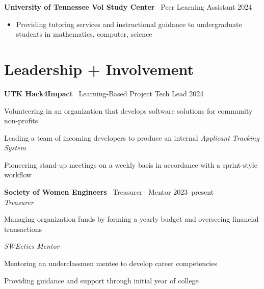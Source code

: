 \documentclass[11pt,a4paper]{article}
\begin{document}
\noindent
\textbf{University of Tennessee Vol Study Center} \textbar\ Peer Learning Assistant \hfill 2024 \vspace{-4pt}
\begin{itemize}[leftmargin=*, topsep=0pt, itemsep=0pt, partopsep=0pt, parsep=0pt]
  \small
  \item Providing tutoring services and instructional guidance to undergraduate students in mathematics, computer, science
\end{itemize}
\vspace{-4pt}

\section*{Leadership + Involvement}

\noindent
\textbf{UTK Hack4Impact} \textbar\ Learning-Based Project Tech Lead \hfill 2024 \vspace{-4pt}
\begin{itemize}[leftmargin=*, topsep=0pt, itemsep=1pt, partopsep=0pt, parsep=0pt]
  {\small
  \item Volunteering in an organization that develops software solutions for community non-profits
  \item Leading a team of incoming developers to produce an internal \textit{Applicant Tracking System}
  \item Pioneering stand-up meetings on a weekly basis in accordance with a sprint-style workflow
  }
\end{itemize}
\vspace{-5pt}

\noindent
\textbf{Society of Women Engineers} \textbar\ Treasurer \textbar\ Mentor \hfill 2023--present \\ [-1pt]
\noindent\textit{Treasurer} \vspace{-6pt}
\begin{itemize}[leftmargin=*, topsep=0pt, itemsep=1pt, partopsep=0pt, parsep=0pt]
  {\small
  \item Managing organization funds by forming a yearly budget and overseeing financial transactions
  }
\end{itemize}
\vspace{-5pt}

\textit{SWEeties Mentor} \vspace{-6pt}

\begin{itemize}[leftmargin=*, topsep=0pt, itemsep=1pt, partopsep=0pt, parsep=0pt]
  {\small
  \item Mentoring an underclassmen mentee to develop career competencies
  \item Providing guidance and support through initial year of college
  }
\end{itemize}
\vspace{-5pt}
\end{document}
